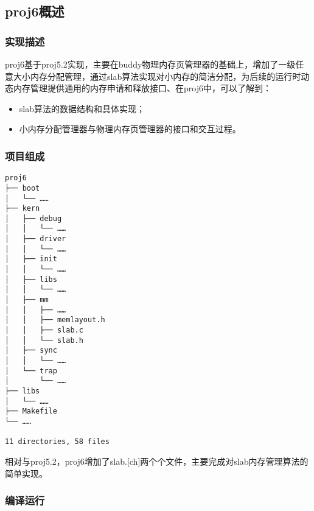 \subsection{proj6概述}\label{proj6ux6982ux8ff0}

\subsubsection{实现描述}\label{ux5b9eux73b0ux63cfux8ff0}

proj6基于proj5.2实现，主要在buddy物理内存页管理器的基础上，增加了一级任意大小内存分配管理，通过slab算法实现对小内存的简洁分配，为后续的运行时动态内存管理提供通用的内存申请和释放接口、在proj6中，可以了解到：

\begin{itemize}
\item
  slab算法的数据结构和具体实现；
\item
  小内存分配管理器与物理内存页管理器的接口和交互过程。
\end{itemize}

\subsubsection{项目组成}\label{ux9879ux76eeux7ec4ux6210}

\begin{lstlisting}
proj6
├── boot
│   └── ……
├── kern
│   ├── debug
│   │   └── ……
│   ├── driver
│   │   └── ……
│   ├── init
│   │   └── ……
│   ├── libs
│   │   └── ……
│   ├── mm
│   │   ├── ……
│   │   ├── memlayout.h
│   │   ├── slab.c
│   │   └── slab.h
│   ├── sync
│   │   └── ……
│   └── trap
│       └── ……
├── libs
│   └── ……
├── Makefile
└── ……

11 directories, 58 files
\end{lstlisting}

相对与proj5.2，proj6增加了slab.{[}ch{]}两个个文件，主要完成对slab内存管理算法的简单实现。

\subsubsection{编译运行}\label{ux7f16ux8bd1ux8fd0ux884c}

